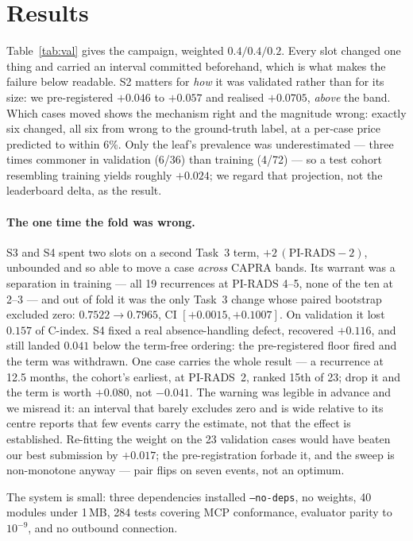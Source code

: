 \documentclass[runningheads]{llncs}
\newcommand{\code}[1]{\texttt{\small #1}}
\begin{document}
\section{Results}
\label{sec:results}

Table~\ref{tab:val} gives the campaign, weighted $0.4/0.4/0.2$. Every slot changed one
thing and carried an interval committed beforehand, which is what makes the failure
below readable. S2 matters for \emph{how} it was validated rather than for its size:
we pre-registered $+0.046$ to $+0.057$ and realised $+0.0705$, \emph{above} the band.
Which cases moved shows the mechanism right and the magnitude wrong: exactly six
changed, all six from wrong to the ground-truth label, at a per-case price predicted
to within 6\%. Only the leaf's prevalence was
underestimated --- three times commoner in validation (6/36) than training (4/72) ---
so a test cohort resembling training yields roughly $+0.024$; we regard that
projection, not the leaderboard delta, as the result.

\paragraph{The one time the fold was wrong.}
S3 and S4 spent two slots on a second Task~3 term, $+2\,(\text{PI-RADS}-2)$, unbounded
and so able to move a case \emph{across} CAPRA bands. Its warrant was a separation in
training --- all 19 recurrences at PI-RADS 4--5, none of the ten at 2--3 --- and out of
fold it was the only Task~3 change whose paired bootstrap excluded zero: $0.7522 \to
0.7965$, CI $[+0.0015, +0.1007]$. On validation it lost $0.157$ of C-index. S4 fixed a
real absence-handling defect, recovered $+0.116$, and still landed $0.041$ below the
term-free ordering: the pre-registered floor fired and the term was withdrawn. One
case carries the whole result --- a recurrence at 12.5 months, the cohort's earliest,
at PI-RADS~2, ranked 15th of 23; drop it and the term is worth $+0.080$, not $-0.041$.
The warning was legible in advance and we misread it: an interval that barely excludes
zero and is wide relative to its centre reports that few events carry the estimate,
not that the effect is established. Re-fitting the weight on the 23 validation cases
would have beaten our best submission by $+0.017$; the pre-registration forbade it,
and the sweep is non-monotone anyway --- pair flips on seven events, not an optimum.

The system is small: three dependencies installed \code{--no-deps}, no weights, 40
modules under 1\,MB, 284 tests covering MCP conformance, evaluator parity to
$10^{-9}$, and no outbound connection.
\end{document}
